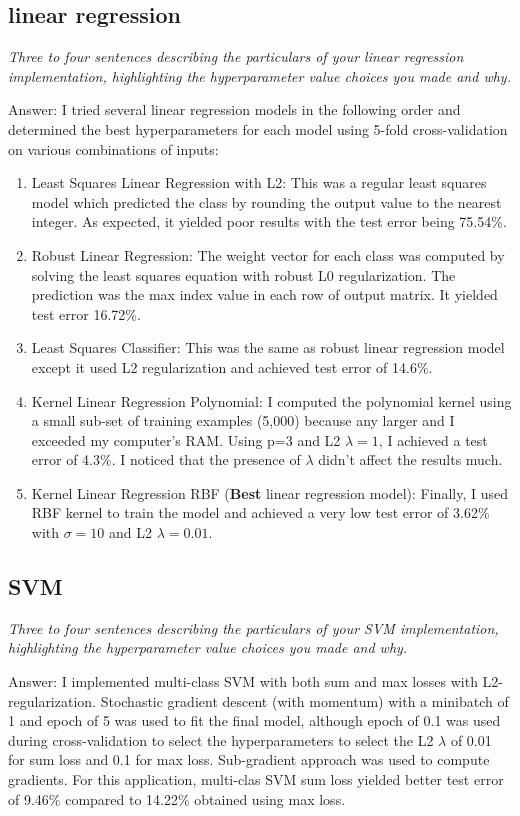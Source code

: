 \documentclass{article}
\def\ans#1{\par\gre{Answer: #1}}{}
\def\gre#1{{\color{gre}#1}}
\def\enum#1{\begin{enumerate}#1\end{enumerate}}
\begin{document}
\subsection{linear regression}
\emph{Three to four sentences describing the particulars of your linear regression implementation, highlighting the hyperparameter value choices you made and why.}
\ans{I tried several linear regression models in the following order and determined the best hyperparameters for each model using 5-fold cross-validation on various combinations of inputs:
\enum{
\item Least Squares Linear Regression with L2: This was a regular least squares model which predicted the class by rounding the output value to the nearest integer. As expected, it yielded poor results with the test error being 75.54\%. 
\item Robust Linear Regression: The weight vector for each class was computed by solving the least squares equation with robust L0 regularization. The prediction was the max index value in each row of output matrix. It yielded test error 16.72\%.
\item Least Squares Classifier: This was the same as robust linear regression model except it used L2 regularization and achieved test error of 14.6\%. 
\item Kernel Linear Regression Polynomial: I computed the polynomial kernel using a small sub-set of training examples (5,000) because any larger and I exceeded my computer's RAM. Using p=3 and L2 $\lambda = 1$, I achieved a test error of 4.3\%. I noticed that the presence of $\lambda$ didn't affect the results much.
\item Kernel Linear Regression RBF (\textbf{Best} linear regression model): Finally, I used RBF kernel to train the model and achieved a very low test error of 3.62\% with $\sigma = 10$ and L2 $\lambda = 0.01$.
}}
\subsection{SVM}
\emph{Three to four sentences describing the particulars of your SVM implementation, highlighting the hyperparameter value choices you made and why.}
\ans{I implemented multi-class SVM with both sum and max losses with L2-regularization. Stochastic gradient descent (with momentum) with a minibatch of 1 and epoch of 5 was used to fit the final model, although epoch of 0.1 was used during cross-validation to select the hyperparameters to select the L2 $\lambda$ of 0.01 for sum loss and 0.1 for max loss. Sub-gradient approach was used to compute gradients. For this application, multi-clas SVM sum loss yielded better test error of 9.46\% compared to 14.22\% obtained using max loss.}
\end{document}
